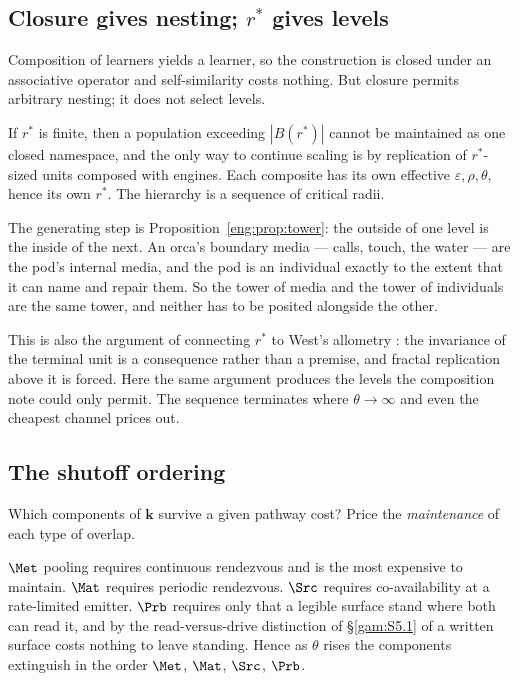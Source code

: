 \subsection{Closure gives nesting; $r^\ast$ gives levels}\label{eng:S9.1}

Composition of learners yields a learner, so the construction is closed
under an associative operator and self-similarity costs nothing. But
closure permits arbitrary nesting; it does not select levels.

\begin{proposition}\label{eng:levels-forced-finite-r}
If $r^\ast$ is finite, then a population exceeding $|B(r^\ast)|$ cannot be
maintained as one closed namespace, and the only way to continue scaling is
by replication of $r^\ast$-sized units composed with engines. Each
composite has its own effective $\varepsilon, \rho, \theta$, hence its own
$r^\ast$. The hierarchy is a sequence of critical radii.
\end{proposition}

The generating step is Proposition~\ref{eng:prop:tower}: the outside of one
level is the inside of the next. An orca's boundary media --- calls, touch,
the water --- are the pod's internal media, and the pod is an individual
exactly to the extent that it can name and repair them. So the tower of
media and the tower of individuals are the same tower, and neither has to
be posited alongside the other.

This is also the argument of \cite[\S6]{compaut} connecting $r^\ast$ to
West's allometry \cite{west}: the invariance of the terminal unit is a consequence
rather than a premise, and fractal replication above it is forced. Here the
same argument produces the levels the composition note could only permit.
The sequence terminates where $\theta \to \infty$ and even the cheapest
channel prices out.

\subsection{The shutoff ordering}\label{eng:S9.2}

Which components of $\mathbf{k}$ survive a given pathway cost? Price the
\emph{maintenance} of each type of overlap.

\begin{observation}\label{eng:obs:order}
$\Met$ pooling requires continuous rendezvous and is the most expensive to
maintain. $\Mat$ requires periodic rendezvous. $\Src$ requires
co-availability at a rate-limited emitter. $\Prb$ requires only that a
legible surface stand where both can read it, and by the read-versus-drive
distinction of \S\ref{gam:S5.1} of \chGame a written surface costs nothing to leave
standing. Hence as $\theta$ rises the components extinguish in the order
$\Met$, $\Mat$, $\Src$, $\Prb$.
\end{observation}

